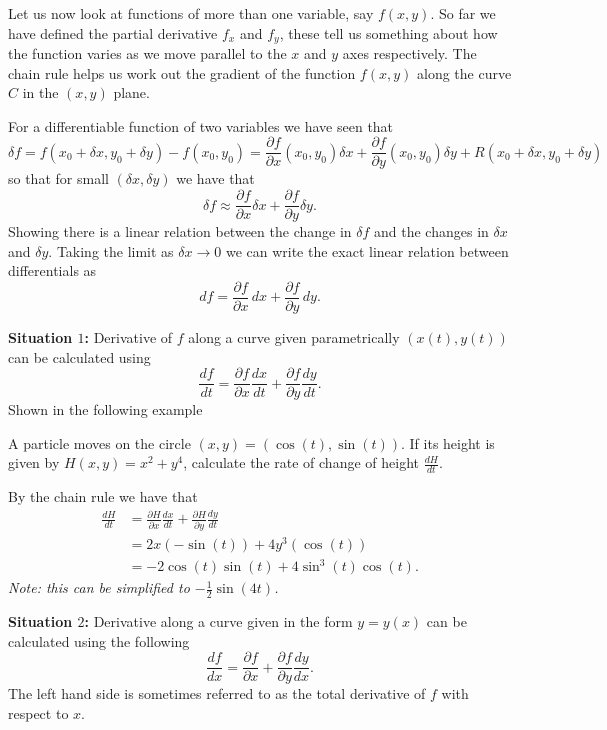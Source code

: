 \documentclass[10pt, a4paper]{article}
\begin{document}
Let us now look at functions of more than one variable,
say $f(x, y)$.
So far we have defined the partial derivative $f_x$ and $f_y$,
these tell us something about how the function varies as we move parallel to the $x$ and $y$ axes respectively.
The chain rule helps us work out the gradient of the function $f(x, y)$ along the curve $C$ in the $(x, y)$ plane.

For a differentiable function of two variables we have seen that
\[
\delta f = f(x_0 + \delta x, y_0 + \delta y) - f(x_0, y_0) = \frac{\partial f}{\partial x}(x_0, y_0)\delta x + \frac{\partial f}{\partial y}(x_0, y_0)\delta y + R(x_0 + \delta x, y_0 + \delta y)
\]
so that for small $(\delta x, \delta y)$ we have that
\[
\delta f \approx \frac{\partial f}{\partial x}\delta x + \frac{\partial f}{\partial y}\delta y.
\]
Showing there is a linear relation between the change in $\delta f$ and the changes in $\delta x$ and $\delta y$.
Taking the limit as $\delta x \rightarrow 0$ we can write the exact linear relation between differentials as
\[
df = \frac{\partial f}{\partial x}\,dx + \frac{\partial f}{\partial y}\,dy.
\]

\textbf{Situation $1$:}
Derivative of $f$ along a curve given parametrically $(x(t), y(t))$ can be calculated using
\[
\frac{df}{dt} = \frac{\partial f}{\partial x}\frac{dx}{dt} + \frac{\partial f}{\partial y}\frac{dy}{dt}.
\]
Shown in the following example

\begin{example}
    A particle moves on the circle $(x, y) = (\cos(t), \sin(t))$.
    If its height is given by $H(x, y) = x ^ 2 + y ^ 4$,
    calculate the rate of change of height $\frac{dH}{dt}$.

    \begin{solution}
        By the chain rule we have that
        \begin{align*}
            \frac{dH}{dt} &= \frac{\partial H}{\partial x}\frac{dx}{dt} + \frac{\partial H}{\partial y}\frac{dy}{dt} \\
            &= 2x(-\sin(t)) + 4y ^ 3(\cos(t)) \\
            &= -2\cos(t)\sin(t) + 4\sin ^ 3(t)\cos(t).
        \end{align*}
        \textit{Note:
        this can be simplified to $-\frac{1}{2}\sin(4t)$.}
    \end{solution}
\end{example}

\textbf{Situation $2$:}
Derivative along a curve given in the form $y = y(x)$ can be calculated using the following
\[
\frac{df}{dx} = \frac{\partial f}{\partial x} + \frac{\partial f}{\partial y}\frac{dy}{dx}.
\]
The left hand side is sometimes referred to as the total derivative of $f$ with respect to $x$.
\end{document}
